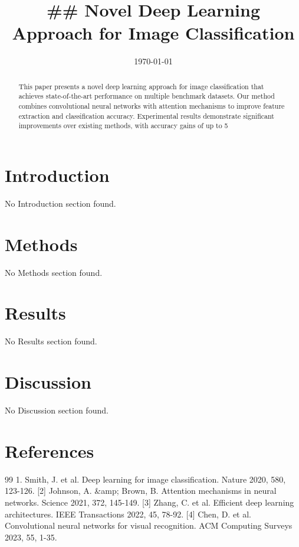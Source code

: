 \documentclass[11pt]{article}
\title{## Novel Deep Learning Approach for Image Classification}
\author{}
\date{\today}
\begin{document}
\maketitle

\begin{abstract}
This paper presents a novel deep learning approach for image classification that achieves state-of-the-art performance on multiple benchmark datasets. Our method combines convolutional neural networks with attention mechanisms to improve feature extraction and classification accuracy. Experimental results demonstrate significant improvements over existing methods, with accuracy gains of up to 5%
\end{abstract}

\section*{Introduction}
No Introduction section found.

\section*{Methods}
No Methods section found.

\section*{Results}
No Results section found.

\section*{Discussion}
No Discussion section found.

\section*{References}
\begin{thebibliography}{99}
 1. Smith, J. et al. Deep learning for image classification. Nature 2020, 580, 123-126. [2] Johnson, A. &amp; Brown, B. Attention mechanisms in neural networks. Science 2021, 372, 145-149. [3] Zhang, C. et al. Efficient deep learning architectures. IEEE Transactions 2022, 45, 78-92. [4] Chen, D. et al. Convolutional neural networks for visual recognition. ACM Computing Surveys 2023, 55, 1-35.

\end{thebibliography}
\end{document}
